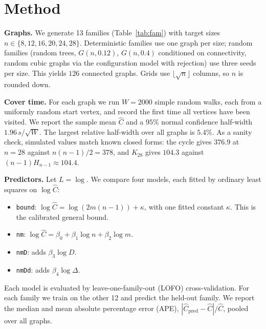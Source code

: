 \documentclass{article}
\begin{document}
\section{Method}
\textbf{Graphs.} We generate 13 families (Table~\ref{tab:fam}) with target sizes $n\in\{8,12,16,20,24,28\}$. Deterministic families use one graph per size; random families (random trees, $G(n,0.12)$, $G(n,0.4)$ conditioned on connectivity, random cubic graphs via the configuration model with rejection) use three seeds per size. This yields $126$ connected graphs. Grids use $\lfloor\sqrt n\rfloor$ columns, so $n$ is rounded down.

\textbf{Cover time.} For each graph we run $W=2000$ simple random walks, each from a uniformly random start vertex, and record the first time all vertices have been visited. We report the sample mean $\hat C$ and a $95\%$ normal confidence half-width $1.96\,s/\sqrt W$. The largest relative half-width over all graphs is $5.4\%$. As a sanity check, simulated values match known closed forms: the cycle gives $376.9$ at $n=28$ against $n(n-1)/2=378$, and $K_{28}$ gives $104.3$ against $(n-1)H_{n-1}\approx 104.4$.

\textbf{Predictors.} Let $L=\log$. We compare four models, each fitted by ordinary least squares on $\log \hat C$:
\begin{itemize}
\item \texttt{bound}: $\log \hat C = \log(2m(n-1)) + \kappa$, with one fitted constant $\kappa$. This is the calibrated general bound.
\item \texttt{nm}: $\log \hat C = \beta_0 + \beta_1\log n + \beta_2\log m$.
\item \texttt{nmD}: adds $\beta_3 \log D$.
\item \texttt{nmDd}: adds $\beta_4\log\Delta$.
\end{itemize}
Each model is evaluated by leave-one-family-out (LOFO) cross-validation. For each family we train on the other 12 and predict the held-out family. We report the median and mean absolute percentage error (APE), $|\hat C_{\text{pred}}-\hat C|/\hat C$, pooled over all graphs.
\end{document}

